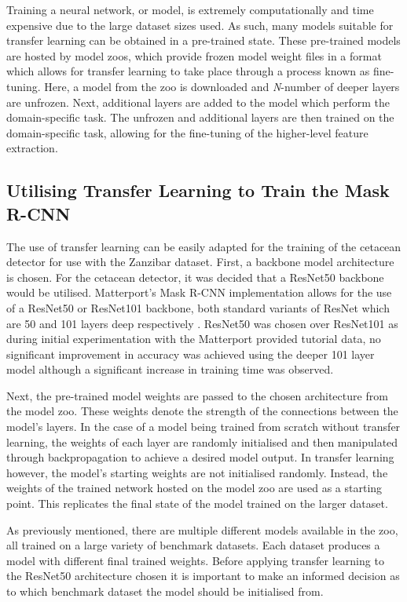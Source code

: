 Training a neural network, or model, is extremely computationally and time expensive due to the large dataset sizes used. As such, many models suitable for transfer learning can be obtained in a pre-trained state. These pre-trained models are hosted by model zoos, which provide frozen model weight files in a format which allows for transfer learning to take place through a process known as fine-tuning. Here, a model from the zoo is downloaded and \textit{N}-number of deeper layers are unfrozen. Next, additional layers are added to the model which perform the domain-specific task. The unfrozen and additional layers are then trained on the domain-specific task, allowing for the fine-tuning of the higher-level feature extraction. 

\subsection{Utilising Transfer Learning to Train the Mask R-CNN}\label{ch:cetDet,sec:initialTesting,sub:transferLearningforTheDetector}

The use of transfer learning can be easily adapted for the training of the cetacean detector for use with the Zanzibar dataset. First, a backbone model architecture is chosen. For the cetacean detector, it was decided that a ResNet50 backbone would be utilised. Matterport's Mask R-CNN implementation allows for the use of a ResNet50 or ResNet101 backbone, both standard variants of ResNet which are 50 and 101 layers deep respectively \cite{he_deep_2015}. ResNet50 was chosen over ResNet101 as during initial experimentation with the Matterport provided tutorial data, no significant improvement in accuracy was achieved using the deeper 101 layer model although a significant increase in training time was observed.

Next, the pre-trained model weights are passed to the chosen architecture from the model zoo. These weights denote the strength of the connections between the model's layers. In the case of a model being trained from scratch without transfer learning, the weights of each layer are randomly initialised and then manipulated through backpropagation to achieve a desired model output. In transfer learning however, the model's starting weights are not initialised randomly. Instead, the weights of the trained network hosted on the model zoo are used as a starting point. This replicates the final state of the model trained on the larger dataset. 

As previously mentioned, there are multiple different models available in the zoo, all trained on a large variety of benchmark datasets. Each dataset produces a model with different final trained weights. Before applying transfer learning to the ResNet50 architecture chosen it is important to make an informed decision as to which benchmark dataset the model should be initialised from. 


